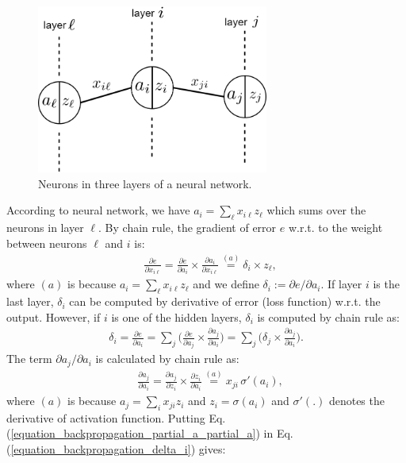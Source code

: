 \documentclass[lang=cn,10pt]{gorgeousnbook}
\numberwithin{equation}{section}%
\numberwithin{figure}{section}%
\begin{document}
\begin{figure}[!t]
\centering
\includegraphics[width=3in]{./images/network_layers}
\caption{Neurons in three layers of a neural network.}
\label{figure_network_layers}
\end{figure}

According to neural network, we have $a_i = \sum_{\ell} x_{i\ell} z_\ell$ which sums over the neurons in layer $\ell$.
By chain rule, the gradient of error $e$ w.r.t. to the weight between neurons $\ell$ and $i$ is:
\begin{align}\label{equation_backpropagation_partial_e_partial_x}
& \frac{\partial e}{\partial x_{i\ell}} = \frac{\partial e}{\partial a_i} \times \frac{\partial a_i}{\partial x_{i\ell}} \overset{(a)}{=} \delta_i \times z_\ell,
\end{align}
where $(a)$ is because $a_i = \sum_{\ell} x_{i\ell} z_\ell$ and we define $\delta_i := \partial e / \partial a_i$. 
If layer $i$ is the last layer, $\delta_i$ can be computed by derivative of error (loss function) w.r.t. the output. However, if $i$ is one of the hidden layers, $\delta_i$ is computed by chain rule as:
\begin{align}\label{equation_backpropagation_delta_i}
\delta_i = \frac{\partial e}{\partial a_i} = \sum_j \Big(\frac{\partial e}{\partial a_j} \times \frac{\partial a_j}{\partial a_i}\Big) = \sum_j \Big(\delta_j \times \frac{\partial a_j}{\partial a_i}\Big).
\end{align}
The term $\partial a_j / \partial a_i$ is calculated by chain rule as:
\begin{align}\label{equation_backpropagation_partial_a_partial_a}
& \frac{\partial a_j}{\partial a_i} = \frac{\partial a_j}{\partial z_i} \times \frac{\partial z_i}{\partial a_i} \overset{(a)}{=} x_{ji}\, \sigma'(a_i),
\end{align}
where $(a)$ is because $a_j = \sum_i x_{ji} z_i$ and $z_i = \sigma(a_i)$ and $\sigma'(.)$ denotes the derivative of activation function. 
Putting Eq. (\ref{equation_backpropagation_partial_a_partial_a}) in Eq. (\ref{equation_backpropagation_delta_i}) gives:
\end{document}

